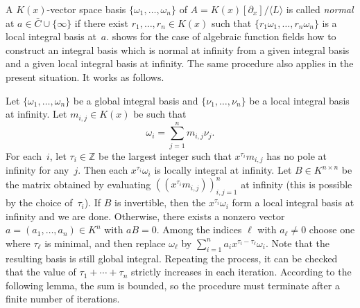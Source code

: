 \documentclass[final,1p,times,authoryear]{elsarticle}
\def\<#1>{\langle#1\rangle}
\let\set\mathbb
\begin{document}
A $K(x)$-vector space basis $\{\omega_1,\dots,\omega_n\}$ of $A=K(x)[\partial_x]/\<L>$ is
called \emph{normal} at $a\in\bar C\cup\{\infty\}$ if there exist $r_1,\dots,r_n\in
K(x)$ such that $\{r_1\omega_1,\dots,r_n\omega_n\}$ is a local integral basis
at~$a$. \cite{trager84} shows for the case of algebraic function fields how to construct
an integral basis which is normal at infinity from a given integral basis and
a given local integral basis at infinity. The same procedure also applies
in the present situation. It works as follows.

Let $\{\omega_1,\dots,\omega_n\}$ be a global integral basis and $\{\nu_1,\dots,\nu_n\}$ be a local
integral basis at infinity. Let $m_{i,j}\in K(x)$ be such that
\[
 \omega_i = \sum_{j=1}^n m_{i,j}\nu_j.
\]
For each~$i$, let $\tau_i\in\set Z$ be the largest integer such that $x^{\tau_i}m_{i,j}$ has no pole at infinity for any~$j$.
Then each $x^{\tau_i}\omega_i$ is locally integral at infinity.
Let $B\in K^{n\times n}$ be the matrix obtained by evaluating $((x^{\tau_i}m_{i,j}))_{i,j=1}^n$ at infinity
(this is possible by the choice of~$\tau_i$).
If $B$ is invertible, then the $x^{\tau_i}\omega_i$ form a local integral basis at infinity and we are done.
Otherwise, there exists a nonzero vector $a=(a_1,\dots,a_n)\in K^n$ with $aB=0$.
Among the indices $\ell$ with $a_\ell\neq0$ choose one where $\tau_\ell$ is minimal,
and then replace $\omega_\ell$ by $\sum_{i=1}^n a_i x^{\tau_i-\tau_\ell}\omega_i$.
Note that the resulting basis is still global integral.
Repeating the process, it can be checked that the value of $\tau_1+\cdots+\tau_n$ strictly increases in each iteration.
According to the following lemma, the sum is bounded, so the procedure must terminate after a finite
number of iterations.
\end{document}
